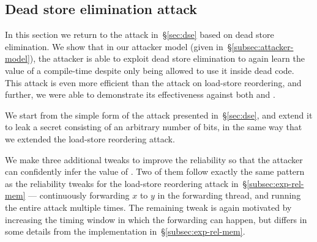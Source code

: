 \documentclass[conference]{IEEEtran}
\theoremstyle{plain}
\theoremstyle{definition}
\newcommand{\ignore}[1]{}
\begin{document}
\subsection{Dead store elimination attack}
\label{subsec:exp-dse}

In this section we return to the attack in~\S\ref{sec:dse} based on
dead store elimination.
We show that in our attacker model (given in~\S\ref{subsec:attacker-model}),
the attacker is able to exploit dead
store elimination to again learn the value of a compile-time {\SEC}
despite only being allowed to use it inside dead code.
This attack is even more efficient than the attack on load-store reordering,
and further, we were able to demonstrate its effectiveness against both
{\GCC} and {\CLANG}.

We start from the simple form of the attack presented in~\S\ref{sec:dse},
and extend it to leak a secret consisting of an
arbitrary number of bits, in the same way that we extended the load-store
reordering attack.
\ignore{
As we did in the load-store reordering attack, we again compile \verb|N| copies
of the test function, each performing a boolean test on a single bit of the
secret.
The function used for reading the \verb|k|th bit is as follows (for
\verb|N <= 64|):
\[\begin{array}[t]{@{}l}
  \VAR x\GETS0\SEMI\\\quad
    r\GETS x
  \PAR\begin{array}[t]{@{}l}
    x\GETS 1\SEMI\\
    \IF(\CANREAD(\SEC))\THEN \IF(\SEC\,\texttt{ \& (1 << k)}\NOTEQ0)\THEN x\GETS 2\FI
    \brELSE x\GETS 2\FI
\end{array}\end{array}\]
\ignore{
\begin{verbatim}
    (
      r := x;
    ) || (
      x := 1;
      if (canRead(SECRET)) {
        if (SECRET & (1 << k)) { x := 2; }
      } else {
        x := 2;
      }
    )
\end{verbatim}
}
Then, we test each function in turn, each time noting the value of $y$
observed by the `listening' thread.
If {\SEC} is 1, the $x\GETS 2$ assignment is
guaranteed to happen, so the compiler can eliminate the $x \GETS 1$
assignment as a dead store and we will observe $y\EQ 2$; however, if
{\SEC} is 0, the $x\GETS 1$ assignment cannot be
eliminated, and we will observe $y\EQ 1$ with some probability.
The extension of the attack to the general case with truly arbitrary \verb|N|
is straightforward and proceeds exactly as it did for the attack on
load-store reordering.
}
We make three additional tweaks to improve the reliability so that the attacker
can confidently infer the value of {\SEC}.
Two of them follow exactly the same pattern as the reliability tweaks
for the load-store reordering attack in~\S\ref{subsec:exp-rel-mem} ---
continuously forwarding $x$ to $y$ in the forwarding thread, and running the
entire attack multiple times.
The remaining tweak is again motivated by increasing the timing window in
which the forwarding can happen, but differs in some details from the
implementation in~\S\ref{subsec:exp-rel-mem}.
\end{document}
